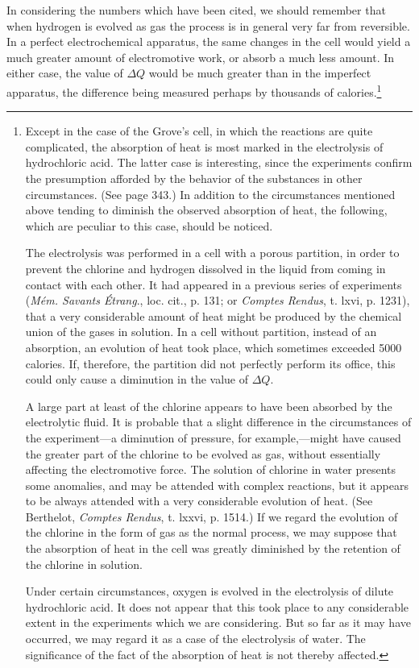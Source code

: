 \documentclass[12pt]{article}
\begin{document}
In considering the numbers which have been cited, we should remember that when hydrogen is evolved as gas the process is in general very far from reversible. In a perfect electrochemical apparatus, the same changes in the cell would yield a much greater amount of electromotive work, or absorb a much less amount. In either case, the value of $\Delta Q$ would be much greater than in the imperfect apparatus, the difference being measured perhaps by thousands of calories.\footnote{Except in the case of the Grove's cell, in which the reactions are quite complicated, the absorption of heat is most marked in the electrolysis of hydrochloric acid. The latter case is interesting, since the experiments confirm the presumption afforded by the behavior of the substances in other circumstances. (See page 343.) In addition to the circumstances mentioned above tending to diminish the observed absorption of heat, the following, which are peculiar to this case, should be noticed. \par
The electrolysis was performed in a cell with a porous partition, in order to prevent the chlorine and hydrogen dissolved in the liquid from coming in contact with each other. It had appeared in a previous series of experiments (\textit{M\'{e}m. Savants \'{E}trang}., loc. cit., p. 131; or \textit{Comptes Rendus}, t. lxvi, p. 1231), that a very considerable amount of heat might be produced by the chemical union of the gases in solution. In a cell without partition, instead of an absorption, an evolution of heat took place, which sometimes exceeded 5000 calories. If, therefore, the partition did not perfectly perform its office, this could only cause a diminution in the value of $\Delta Q$. \par
A large part at least of the chlorine appears to have been absorbed by the electrolytic fluid. It is probable that a slight difference in the circumstances of the experiment---a diminution of pressure, for example,---might have caused the greater part of the chlorine to be evolved as gas, without essentially affecting the electromotive force. The solution of chlorine in water presents some anomalies, and may be attended with complex reactions, but it appears to be always attended with a very considerable evolution of heat. (See Berthelot, \textit{Comptes Rendus}, t. lxxvi, p. 1514.) If we regard the evolution of the chlorine in the form of gas as the normal process, we may suppose that the absorption of heat in the cell was greatly diminished by the retention of the chlorine in solution.\par
Under certain circumstances, oxygen is evolved in the electrolysis of dilute hydrochloric acid. It does not appear that this took place to any considerable extent in the experiments which we are considering. But so far as it may have occurred, we may regard it as a case of the electrolysis of water. The significance of the fact of the absorption of heat is not thereby affected.}
\end{document}
